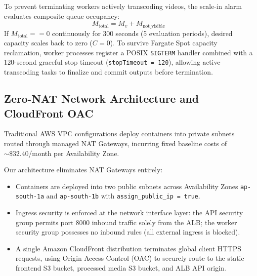 \documentclass[conference]{IEEEtran}
\begin{document}
To prevent terminating workers actively transcoding videos, the scale-in alarm evaluates composite queue occupancy:
\begin{equation}
    M_{\text{total}} = M_v + M_{\text{not\_visible}}
\end{equation}
If $M_{\text{total}} == 0$ continuously for 300 seconds (5 evaluation periods), desired capacity scales back to zero ($C = 0$). To survive Fargate Spot capacity reclamation, worker processes register a POSIX \texttt{SIGTERM} handler combined with a 120-second graceful stop timeout (\texttt{stopTimeout = 120}), allowing active transcoding tasks to finalize and commit outputs before termination.

\subsection{Zero-NAT Network Architecture and CloudFront OAC}
Traditional AWS VPC configurations deploy containers into private subnets routed through managed NAT Gateways, incurring fixed baseline costs of $\sim\$32.40$/month per Availability Zone. 

Our architecture eliminates NAT Gateways entirely:
\begin{itemize}
    \item Containers are deployed into two public subnets across Availability Zones \texttt{ap-south-1a} and \texttt{ap-south-1b} with \texttt{assign\_public\_ip = true}.
    \item Ingress security is enforced at the network interface layer: the API security group permits port 8000 inbound traffic solely from the ALB; the worker security group possesses no inbound rules (all external ingress is blocked).
    \item A single Amazon CloudFront distribution terminates global client HTTPS requests, using Origin Access Control (OAC) to securely route to the static frontend S3 bucket, processed media S3 bucket, and ALB API origin.
\end{itemize}
\end{document}
